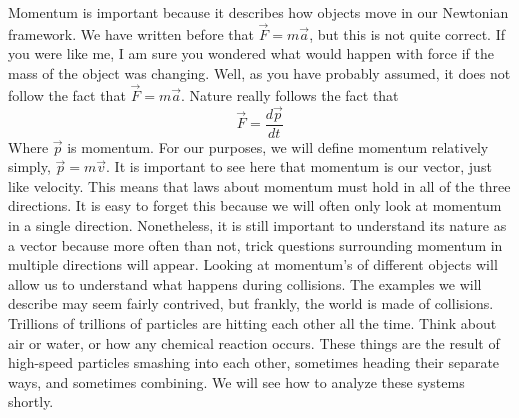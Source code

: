 \newline

Momentum is important because it describes how objects move in our Newtonian framework. We have written before that $\vec{F} = m\vec{a}$, but this is not quite correct. If you were like me, I am sure you wondered what would happen with force if the mass of the object was changing. Well, as you have probably assumed, it does not follow the fact that $\vec{F}=m\vec{a}$. Nature really follows the fact that \begin{equation}\vec{F}=\frac{d\vec{p}}{dt}\end{equation} Where $\vec{p}$ is momentum. For our purposes, we will define momentum relatively simply, $\vec{p}=m\vec{v}$. It is important to see here that momentum is our vector, just like velocity. This means that laws about momentum must hold in all of the three directions. It is easy to forget this because we will often only look at momentum in a single direction. Nonetheless, it is still important to understand its nature as a vector because more often than not, trick questions surrounding momentum in multiple directions will appear. Looking at momentum's of different objects will allow us to understand what happens during collisions. The examples we will describe may seem fairly contrived, but frankly, the world is made of collisions. Trillions of trillions of particles are hitting each other all the time. Think about air or water, or how any chemical reaction occurs. These things are the result of high-speed particles smashing into each other, sometimes heading their separate ways, and sometimes combining. We will see how to analyze these systems shortly. 